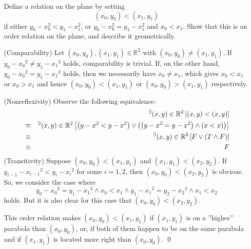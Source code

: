\documentclass[a4paper,12pt]{article}
\begin{document}
\begin{exe}
	Define a relation on the plane by setting
	\begin{equation*}
		(x_0,y_0) < (x_1,y_1) 
	\end{equation*}
	if either \( y_0 - x_0^{2} < y_1 - x_1^{2} \),
	or
	\( y_0 - x_0^{2} = y_1 - x_1^{2} \) and \( x_0 < x_1 \).
	Show that this is an order relation on the plane,
	and describe it geometrically.
\end{exe}\begin{sol}
	(Comparability)
	Let
	\( (x_0,y_0), (x_1,y_1) \in \mathbb{R}^2\)
	with
	\( (x_0,y_0) \neq (x_1,y_1) \).
	If
	\( y_0 - {x_0}^2 \neq y_1 - {x_1}^2 \)
	holds, comparability is trivial.
	If, on the other hand,
	\( y_0-{x_0}^2 = y_1 -{x_1}^2 \)
	holds,
	then we necessarily have
	\( x_0 \neq x_1 \),
	which gives
	\( x_0 < x_1 \)
	or
	\( x_0 > x_1 \)
	and hence
	\( (x_0,y_0) < (x_1,y_1) \)
	or
	\( (x_0,y_0) > (x_1,y_1) \)
	respectively.
	
	(Nonreflexivity)
	Observe the following equivalence:
	\begin{eqnarray*}
		&&
		{}^{\exists} (x,y) \in \mathbb{R}^2
		\left[ (x,y) < (x,y) \right]\\
		&\equiv&
		{}^{\exists} (x,y) \in \mathbb{R}^2
		\left[
			\left( y-x^2 < y-x^2\right) \vee
			\left( \left( y-x^2=y-x^2 \right) \wedge (x<x) \right)
			\right]\\
		&\equiv&
		{}^{\exists} (x,y) \in \mathbb{R}^2
		\left[
			F \vee
			\left( T \wedge F \right)
			\right]\\
		&\equiv&
		F
	\end{eqnarray*}
	\indent(Transitivity)
	Suppose
	\( (x_0,y_0) < (x_{1},y_{1})\)
	and
	\( (x_1,y_1) < (x_{2},y_{2})\).
	If 
	\( y_{i-1} - {x_{i-1}}^2 <  y_{i} - {x_{i}}^2\)
	for some \( i=1,2 \),
	then
	\( (x_0,y_0) < (x_{2},y_{2})\)
	is obvious.
	So, we consider the case where
	\begin{equation*}
		y_{0} - {x_{0}}^2 = y_{1} - {x_{1}}^2
		\wedge
		x_0<x_1
		\wedge
		y_{1} - {x_{1}}^2 = y_{2} - {x_{2}}^2
		\wedge
		x_1<x_2
	\end{equation*}
	holds.
	But it is also clear for this case that
	\( (x_0,y_0) < (x_{2},y_{2})\).
	
	This order relation makes
	\( (x_0,y_0) < (x_{1},y_{1})\)
	if
	\( (x_1,y_1) \)
	is on a ''higher'' parabola than
	\( (x_0,y_0) \),
	or, if both of them happen to be on the same parabola
	and if
	\( (x_1,y_1) \)
	is located more right than
	\( (x_0,y_0) \).
	\qed\end{sol}
\end{document}
